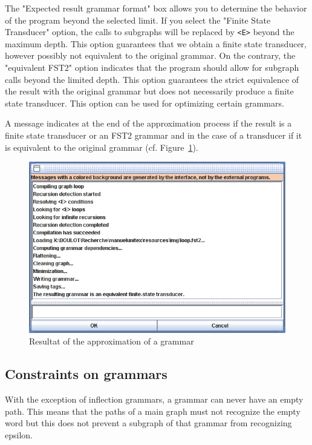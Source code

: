 \bigskip
\noindent The "Expected result grammar format" box allows you to determine the
behavior of the program beyond the selected limit. If you select the "Finite State
Transducer" option, the calls to subgraphs will be replaced by \verb+<E>+
beyond the maximum depth. This option guarantees that we obtain a finite state transducer,
however possibly not equivalent to the original grammar. On the contrary, the
"equivalent FST2" option indicates that the program should allow for subgraph
calls beyond the limited depth. This option guarantees the strict equivalence of
the result with the original grammar but does not necessarily produce a finite
state transducer. This option can be used for optimizing certain grammars.

\bigskip
\noindent A message indicates at the end of the approximation process if the result is a
finite state transducer or an FST2 grammar and in the case of a transducer if it
is equivalent to the original grammar (cf.
Figure~\ref{fig-flatten-result}).

\bigskip
\begin{figure}[!h]
\begin{center}
\includegraphics[width=14.7cm]{resources/img/fig6-6.png}
\caption{Resultat of the approximation of a grammar\label{fig-flatten-result}}
\end{center}
\end{figure}




\subsection{Constraints on grammars}
With the exception of inflection grammars, a grammar can never have an empty
path. This means that the paths of a main graph must not recognize the
empty word but this does not prevent a subgraph of that grammar from recognizing
epsilon.

